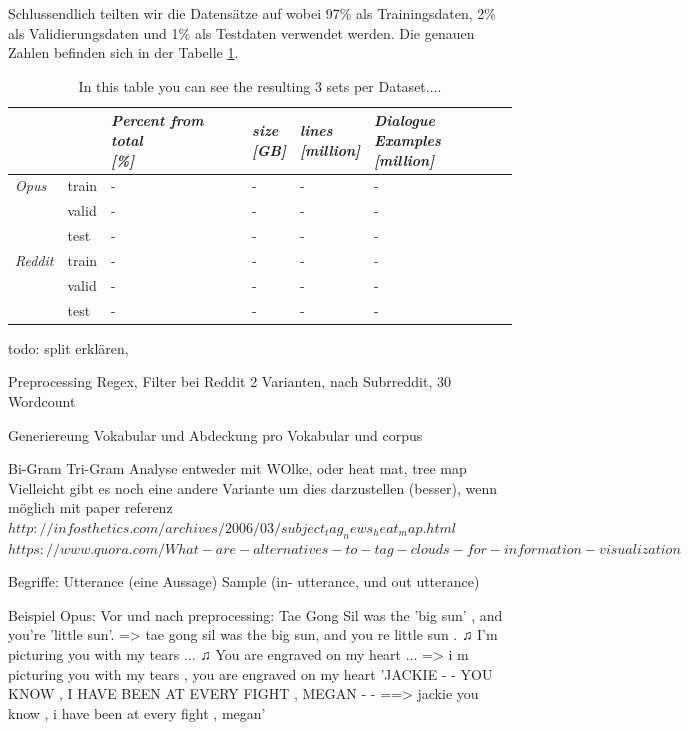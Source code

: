 Schlussendlich teilten wir die Datensätze auf wobei 97\% als Trainingsdaten, 2\% als Validierungsdaten und 1\% als Testdaten verwendet werden. Die genauen Zahlen befinden sich in der Tabelle \ref{tbl:data:split:corpus}.
\begin{table}[H]
	\begin{adjustbox}{max width=\textwidth}
	\centering
	\small
	\begin{tabular}{llllll}
		\toprule
		&  \specialcell{\emph{set}}
		&  \specialcell{\emph{Percent from total} \\\textit{[\%]}}
		&  \specialcell{\emph{size} \\\textit{[GB]}}
		&  \specialcell{\emph{lines} \\\textit{[million]}}
		&  \specialcell{\emph{Dialogue Examples} \\\textit{[million]}}\\
		\midrule
		\emph{Opus}			&train	&-	&-	&-	&-	\\
							&valid	&-	&-	&-	&-	\\
							&test	&-	&-	&-	&-	\\
		\emph{Reddit}		&train	&-	&-	&-	&-	\\
							&valid	&-	&-	&-	&-	\\
							&test	&-	&-	&-	&-	\\
		\bottomrule
	\end{tabular}
	\end{adjustbox}
	\caption{In this table you can see the resulting 3 sets per Dataset....}
	\label{tbl:data:split:corpus}
\end{table}
todo: split erklären, 


Preprocessing
Regex, Filter bei Reddit 2 Varianten, nach Subrreddit, 30 Wordcount


Generiereung Vokabular und Abdeckung pro Vokabular und corpus

Bi-Gram Tri-Gram Analyse entweder mit WOlke, oder heat mat, tree map
Vielleicht gibt es noch eine andere Variante um dies darzustellen (besser), wenn möglich mit paper referenz
$http://infosthetics.com/archives/2006/03/subject_tag_news_heat_map.html$
$https://www.quora.com/What-are-alternatives-to-tag-clouds-for-information-visualization$

Begriffe: Utterance (eine Aussage)
			Sample (in- utterance, und out utterance)
			
Beispiel Opus: Vor und nach preprocessing:
Tae Gong Sil was the 'big sun' , and you're 'little sun'. => tae gong sil was the big sun, and you re little sun .
♫ I'm picturing you with my tears ... ♫ You are engraved on my heart ... => i m picturing you with my tears , you are engraved on my heart
'JACKIE - - YOU KNOW , I HAVE BEEN AT EVERY FIGHT , MEGAN - - ==> jackie you know , i have been at every fight , megan'
